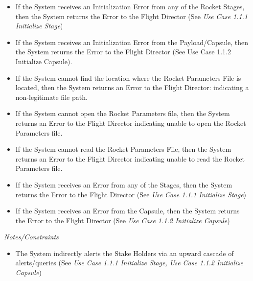 \documentclass[letterpaper]{article}
\begin{document}
\begin{itemize}
   \item[2a]If the System receives an Initialization Error from 
      any of the Rocket Stages, then the System returns the Error to
      the Flight Director (See 
      \textit{Use Case 1.1.1 Initialize Stage})
   \item[3a]If the System receives an Initialization Error from the
      Payload/Capsule, then the System returns the Error to the Flight Director (See Use Case 1.1.2 Initialize Capsule).
   \item[4a,5a]If the System cannot find the location where the Rocket
      Parameters File is located, then the System returns an Error to 
      the Flight Director:  indicating a non-legitimate file path.
   \item[6a]If the System cannot open the Rocket Parameters file, then
      the System returns an Error to the Flight Director indicating 
      unable to open the Rocket Parameters file.
   \item[7a]If the System cannot read the Rocket Parameters File, then
      the System returns an Error to the Flight Director indicating 
      unable to read the Rocket Parameters file.
   \item[9a]If the System receives an Error from any of the Stages,
      then the System returns the Error to the Flight Director (See
      \textit{Use Case 1.1.1 Initialize Stage})
   \item [10a]If the System receives an Error from the Capsule, then
      the System returns the Error to the Flight Director (See 
      \textit{Use Case 1.1.2 Initialize Capsule})
\end{itemize}
\textit{Notes/Constraints}
\begin{itemize}
   \item[11a]The System indirectly alerts the Stake Holders via an
      upward cascade of alerts/queries (See 
      \textit{Use Case 1.1.1 Initialize Stage, 
      Use Case 1.1.2 Initialize Capsule})
\end{itemize}
\end{document}
